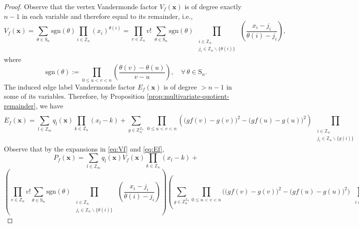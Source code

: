 \begin{proof}
Observe that the vertex Vandermonde factor $V_f(\mathbf{x})$ is of degree exactly $n-1$ in each variable and therefore equal
to its remainder, i.e.,
\begin{equation}\label{eq:Vf}
V_{f}(\mathbf{x})=\sum_{\theta\in\text{S}_{n}}\text{sgn}(\theta)\prod_{i\in\mathbb{Z}_{n}}(x_{i})^{\theta(i)}=\prod_{v\in\mathbb{Z}_{n}}v!\;\sum_{\theta\in\text{S}_{n}}\text{sgn}(\theta)\prod_{\begin{array}{c}
\substack{i\in\mathbb{Z}_{n}\\
j_{i}\in\mathbb{Z}_{n}\backslash\{\theta(i)\}
}
\end{array}}\left(\frac{x_{i}-j_{i}}{\theta(i)-j_{i}}\right),
\end{equation}
where 
\begin{equation}
\text{sgn}(\theta):=\prod_{0\le u<v<n}\left(\frac{\theta(v)-\theta(u)}{v-u}\right),\quad\forall\,\theta\in\text{S}_{n}.
\end{equation}
The induced edge label Vandermonde factor $E_f(\mathbf{x})$
is of degree $>n-1$ in some of its variables. Therefore, by Proposition  \ref{prop:multivariate-quotient-remainder}, we have
\begin{equation}\label{eq:Ef}
E_{f}(\mathbf{x})=\sum_{l\in\mathbb{Z}_{m}}q_{l}(\mathbf{x})\prod_{k\in\mathbb{Z}_{n}}(x_{l}-k)+\sum_{g\in\mathbb{Z}_{n}^{\mathbb{Z}_{n}}}\,\prod_{0\le u<v<n}\left(\big(gf(v)-g(v)\big)^{2}-\big(gf(u)-g(u)\big)^{2}\right)\prod_{\begin{array}{c}
\substack{i\in\mathbb{Z}_{n}\\
j_{i}\in\mathbb{Z}_{n}\backslash\{g(i)\}
}
\end{array}}\left(\frac{x_{i}-j_{i}}{g(i)-j_{i}}\right).
\end{equation}
Observe that by the expansions in \ref{eq:Vf} and \ref{eq:Ef}, 
\[
P_f(\mathbf{x})=\sum_{l\in\mathbb{Z}_{m}}q_{l}(\mathbf{x})V_{f}(\mathbf{x})\prod_{k\in\mathbb{Z}_{n}}(x_{l}-k)+
\]
\[
\left(\prod_{v\in\mathbb{Z}_{n}}v!\sum_{\theta\in\text{S}_{n}}\text{sgn}(\theta)\prod_{\begin{array}{c}
\substack{i\in\mathbb{Z}_{n}\\
j_{i}\in\mathbb{Z}_{n}\backslash\{\theta(i)\}
}
\end{array}}\left(\frac{x_{i}-j_{i}}{\theta(i)-j_{i}}\right)\right)\left(\sum_{g\in\mathbb{Z}_{n}^{\mathbb{Z}_{n}}}\prod_{0\le u<v<n}\bigg(\big(gf(v)-g(v)\big)^{2}-\big(gf(u)-g(u)\big)^{2}\bigg)\prod_{\begin{array}{c}
\substack{i\in\mathbb{Z}_{n}\\
}
\end{array}}\]
\end{proof}
